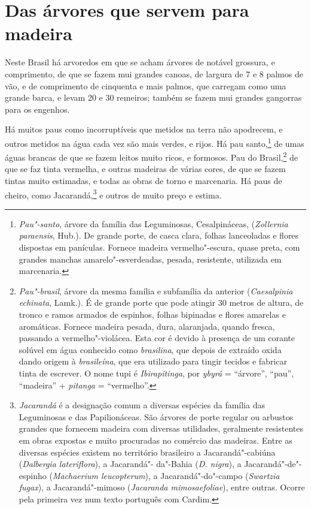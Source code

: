 \section{Das árvores que servem para madeira}
Neste Brasil há arvoredos em que se acham árvores de notável
grossura, e comprimento, de que se fazem mui grandes canoas, de largura
de 7 e 8 palmos de vão, e de comprimento de cinquenta e mais palmos,
que carregam como uma grande barca, e levam 20 e 30 remeiros; também se
fazem mui grandes gangorras para os engenhos.

 Há muitos paus como incorruptíveis que metidos na terra não apodrecem,
e outros metidos na água cada vez são mais verdes, e rijos. Há pau
santo,\footnote{ \textit{Pau"-santo}, árvore da família das
Leguminosas, Cesalpináceas, (\textit{Zollernia paraensis}, Hub.). De
grande porte, de casca clara, folhas lanceoladas e flores dispostas em
panículas. Fornece madeira vermelho"-escura, quase preta, com grandes
manchas amarelo"-esverdeadas, pesada, resistente, utilizada em
marcenaria.} de umas águas brancas de que se fazem leitos muito ricos,
e formosos. Pau do Brasil,\footnote{ \textit{Pau"-brasil}, árvore da
mesma família e subfamília da anterior (\textit{Caesalpinia echinata}, 
Lamk.). É de grande porte que pode atingir 30 metros de altura, de
tronco e ramos armados de espinhos, folhas bipinadas e flores amarelas
e aromáticas. Fornece madeira pesada, dura, alaranjada, quando fresca,
passando a vermelho"-violácea. Esta cor é devido à presença de um
corante solúvel em água conhecido como \textit{brasilina}, que depois
de extraído oxida dando origem à \textit{brasileína}, que era utilizado
para tingir tecidos e fabricar tinta de escrever. O nome tupi é
\textit{Ibirapitinga}, por \textit{ybyrá} = ``árvore'', ``pau'', ``madeira''
+ \textit{pitanga} = ``vermelho''.} de que se faz tinta vermelha, e
outras madeiras de várias cores, de que se fazem tintas muito
estimadas, e todas as obras de torno e marcenaria. Há paus de cheiro,
como Jacarandá,\footnote{ \textit{Jacarandá} é a designação comum a
diversas espécies da família das Leguminosas e das Papilionáceas. São
árvores de porte regular ou arbustos grandes que fornecem madeira com
diversas utilidades, geralmente resistentes em obras expostas e muito
procuradas no comércio das madeiras. Entre as diversas espécies existem
no território brasileiro a Jacarandá"-cabiúna (\textit{Dalbergia
lateriflora}), a Jacarandá"- da"-Bahia (\textit{D. nigra}), a
Jacarandá"-de"-espinho (\textit{Machaerium leucopterum}), a
Jacarandá"-do"-campo (\textit{Swartzia fugax}), a Jacarandá"-mimoso
(\textit{Jacaranda mimosaefoliae}), entre outras. Ocorre pela primeira
vez num texto português com Cardim.} e outros de muito preço e estima.
